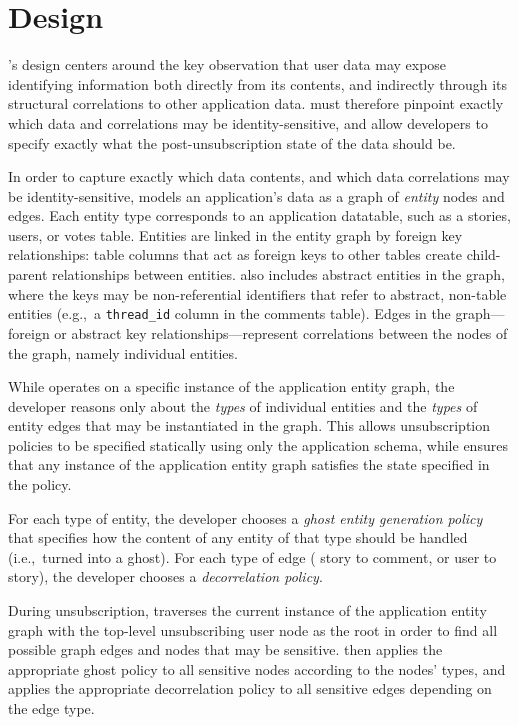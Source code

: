 \section{Design}
\sys's design centers around the key observation that user data may expose identifying information both
directly from its contents, and indirectly through its structural correlations to other application
data. \sys must therefore pinpoint exactly which data and correlations may be identity-sensitive, and allow developers to
specify exactly what the post-unsubscription state of the data should be.

In order to capture exactly which data contents, and which data correlations may be
identity-sensitive, \sys models an application's data as a graph of \emph{entity} nodes and edges.
Each entity type corresponds to an application datatable, such as a stories, users, or votes table.
Entities are linked in the entity graph by foreign key relationships: table columns that act as
foreign keys to other tables create child-parent relationships between entities.  \sys also includes
abstract entities in the graph, where the keys may be non-referential identifiers that refer to
abstract, non-table entities (e.g.,\ a \texttt{thread\_id} column in the comments table).  Edges in
the graph---foreign or abstract key relationships---represent correlations between the nodes of the
graph, namely individual entities.

While \sys operates on a specific instance of the application entity graph, the developer reasons
only about the \emph{types} of individual entities and the \emph{types} of entity edges that may
be instantiated in the graph. This allows unsubscription policies to be specified statically using
only the application schema, while \sys ensures that any instance of the application entity graph satisfies
the state specified in the policy.

For each type of entity, the developer chooses a \emph{ghost entity generation policy} that
specifies how the content of any entity of that type should be handled (i.e.,\ turned into a ghost). For each type of edge (\eg
story to comment, or user to story), the developer chooses a \emph{decorrelation policy}.

During unsubscription, \sys traverses the current instance of the application entity graph with the
top-level unsubscribing user node as the root in order to find all possible graph edges and nodes
that may be sensitive. \sys then applies the appropriate ghost policy to all sensitive nodes
according to the nodes' types, and applies the appropriate decorrelation policy to all sensitive
edges depending on the edge type.


